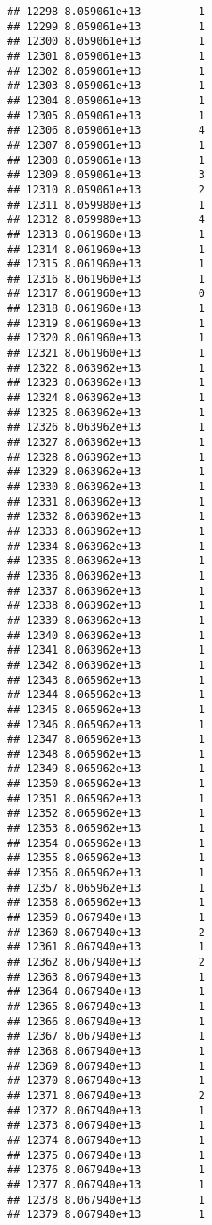 \documentclass[
]{article}
\begin{document}
\begin{verbatim}
## 12298 8.059061e+13         1
## 12299 8.059061e+13         1
## 12300 8.059061e+13         1
## 12301 8.059061e+13         1
## 12302 8.059061e+13         1
## 12303 8.059061e+13         1
## 12304 8.059061e+13         1
## 12305 8.059061e+13         1
## 12306 8.059061e+13         4
## 12307 8.059061e+13         1
## 12308 8.059061e+13         1
## 12309 8.059061e+13         3
## 12310 8.059061e+13         2
## 12311 8.059980e+13         1
## 12312 8.059980e+13         4
## 12313 8.061960e+13         1
## 12314 8.061960e+13         1
## 12315 8.061960e+13         1
## 12316 8.061960e+13         1
## 12317 8.061960e+13         0
## 12318 8.061960e+13         1
## 12319 8.061960e+13         1
## 12320 8.061960e+13         1
## 12321 8.061960e+13         1
## 12322 8.063962e+13         1
## 12323 8.063962e+13         1
## 12324 8.063962e+13         1
## 12325 8.063962e+13         1
## 12326 8.063962e+13         1
## 12327 8.063962e+13         1
## 12328 8.063962e+13         1
## 12329 8.063962e+13         1
## 12330 8.063962e+13         1
## 12331 8.063962e+13         1
## 12332 8.063962e+13         1
## 12333 8.063962e+13         1
## 12334 8.063962e+13         1
## 12335 8.063962e+13         1
## 12336 8.063962e+13         1
## 12337 8.063962e+13         1
## 12338 8.063962e+13         1
## 12339 8.063962e+13         1
## 12340 8.063962e+13         1
## 12341 8.063962e+13         1
## 12342 8.063962e+13         1
## 12343 8.065962e+13         1
## 12344 8.065962e+13         1
## 12345 8.065962e+13         1
## 12346 8.065962e+13         1
## 12347 8.065962e+13         1
## 12348 8.065962e+13         1
## 12349 8.065962e+13         1
## 12350 8.065962e+13         1
## 12351 8.065962e+13         1
## 12352 8.065962e+13         1
## 12353 8.065962e+13         1
## 12354 8.065962e+13         1
## 12355 8.065962e+13         1
## 12356 8.065962e+13         1
## 12357 8.065962e+13         1
## 12358 8.065962e+13         1
## 12359 8.067940e+13         1
## 12360 8.067940e+13         2
## 12361 8.067940e+13         1
## 12362 8.067940e+13         2
## 12363 8.067940e+13         1
## 12364 8.067940e+13         1
## 12365 8.067940e+13         1
## 12366 8.067940e+13         1
## 12367 8.067940e+13         1
## 12368 8.067940e+13         1
## 12369 8.067940e+13         1
## 12370 8.067940e+13         1
## 12371 8.067940e+13         2
## 12372 8.067940e+13         1
## 12373 8.067940e+13         1
## 12374 8.067940e+13         1
## 12375 8.067940e+13         1
## 12376 8.067940e+13         1
## 12377 8.067940e+13         1
## 12378 8.067940e+13         1
## 12379 8.067940e+13         1

\end{verbatim}
\end{document}
